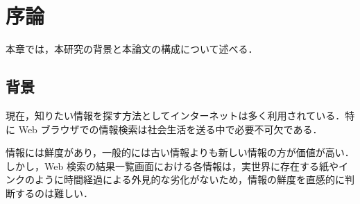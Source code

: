 \chapter{序論}
\label{chap:introduction}

本章では，本研究の背景と本論文の構成について述べる．

\newpage

\section{背景}

現在，知りたい情報を探す方法としてインターネットは多く利用されている．特に Web ブラウザでの情報検索は社会生活を送る中で必要不可欠である．

情報には鮮度があり，一般的には古い情報よりも新しい情報の方が価値が高い．しかし，Web 検索の結果一覧画面における各情報は，実世界に存在する紙やインクのように時間経過による外見的な劣化がないため，情報の鮮度を直感的に判断するのは難しい．

